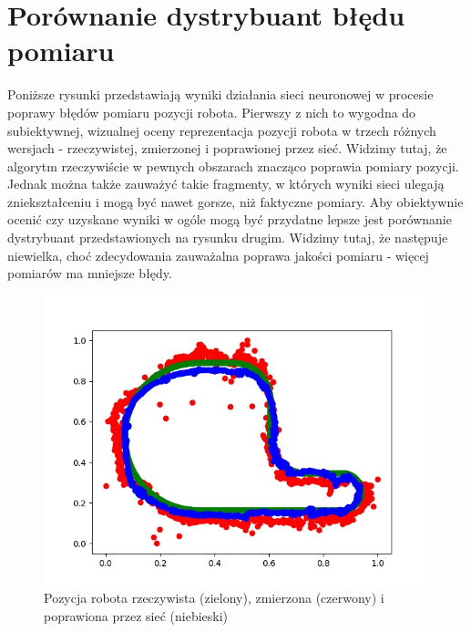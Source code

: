 \documentclass{classrep}
\begin{document}
    \section{Porównanie dystrybuant błędu pomiaru} {

        Poniższe rysunki przedstawiają wyniki działania sieci neuronowej w procesie poprawy błędów
        pomiaru pozycji robota. Pierwszy z nich to wygodna do subiektywnej, wizualnej oceny
        reprezentacja pozycji robota w trzech różnych wersjach - rzeczywistej, zmierzonej i
        poprawionej przez sieć. Widzimy tutaj, że algorytm rzeczywiście w pewnych obszarach znacząco
        poprawia pomiary pozycji. Jednak można także zauważyć takie fragmenty, w których wyniki
        sieci ulegają zniekształceniu i mogą być nawet gorsze, niż faktyczne pomiary. Aby
        obiektywnie ocenić czy uzyskane wyniki w ogóle mogą być przydatne lepsze jest porównanie
        dystrybuant przedstawionych na rysunku drugim. Widzimy tutaj, że następuje niewielka, choć
        zdecydowania zauważalna poprawa jakości pomiaru - więcej pomiarów ma mniejsze błędy.

        \begin{figure}[!htbp]
            \centering
            \includegraphics[width=\textwidth]{img/position.jpg}
            \caption{Pozycja robota rzeczywista (zielony), zmierzona (czerwony) i poprawiona przez
            sieć (niebieski)}
        \end{figure}
        \FloatBarrier

}
\end{document}
